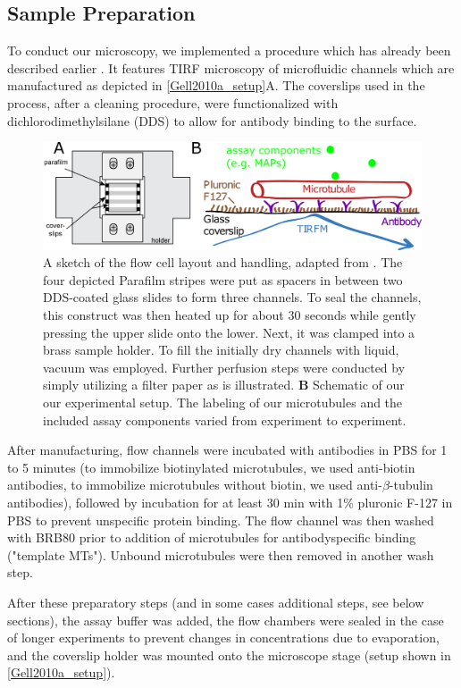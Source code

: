 \subsection{Sample Preparation}
\label{assayPREP}
To conduct our microscopy, we implemented a procedure which has already been described earlier \parencite{Gell2010a}. It features TIRF microscopy of microfluidic channels which are manufactured as depicted in \autoref{Gell2010a_setup}A. The coverslips used in the process, after a cleaning procedure, were functionalized with dichlorodimethylsilane (DDS) to allow for antibody binding to the surface.\par
\begin{figure}[htb]
\centering
\includegraphics[scale=1.1]{Figures/setup.png}
\caption[The flow cell layout and handling, adapted from \parencite{Gell2010a}]{
		A sketch of the flow cell layout and handling, adapted from \parencite{Gell2010a}. The four depicted Parafilm stripes were put as spacers in between two DDS-coated glass slides to form three channels. To seal the channels, this construct was then heated up for about 30 seconds while gently pressing the upper slide onto the lower. Next, it was clamped into a brass sample holder. To fill the initially dry channels with liquid, vacuum was employed. Further perfusion steps were conducted by simply utilizing a filter paper as is illustrated. \textbf{B} Schematic of our our experimental setup. The labeling of our microtubules and the included assay components varied from experiment to experiment. 
	}\label{Gell2010a_setup}
\end{figure}
After manufacturing, flow channels were incubated with antibodies in PBS for 1 to 5 minutes (to immobilize biotinylated microtubules, we used anti-biotin antibodies, to immobilize microtubules without biotin, we used anti-$\beta$-tubulin antibodies), followed by incubation for at least 30 min with 1\% pluronic F-127 in PBS to prevent unspecific protein binding. The flow channel was then washed with BRB80 prior to addition of microtubules for antibodyspecific binding ("template MTs"). Unbound microtubules were then removed in another wash step.\par
After these preparatory steps (and in some cases additional steps, see below sections), the assay buffer was added, the flow chambers were sealed in the case of longer experiments to prevent changes in concentrations due to evaporation, and the coverslip holder was mounted onto the microscope stage (setup shown in \autoref{Gell2010a_setup}).

